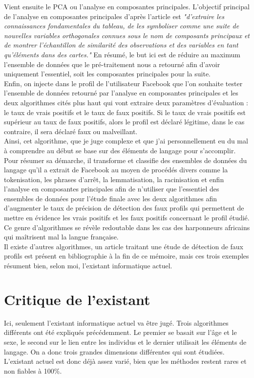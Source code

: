 \documentclass[12pt]{report}
\begin{document}
Vient ensuite le PCA ou l'analyse en composantes principales. L'objectif principal de l'analyse en composantes principales d'après l'article est \textit {"d'extraire les connaissances fondamentales du tableau, de les symboliser comme une suite de nouvelles variables orthogonales connues sous le nom de composants principaux et de montrer l'échantillon de similarité des observations et des variables en tant qu'éléments dans des cartes."} En résumé, le but ici est de réduire au maximum l'ensemble de données que le pré-traitement nous a retourné afin d'avoir uniquement l'essentiel, soit les composantes principales pour la suite.\\

Enfin, on injecte dans le profil de l'utilisateur Facebook que l'on souhaite tester l'ensemble de données retourné par l'analyse en composantes principales et les deux algorithmes cités plus haut qui vont extraire deux paramètres d'évaluation : le taux de vrais positifs et le taux de faux positifs. Si le taux de vrais positifs est supérieur au taux de faux positifs, alors le profil est déclaré légitime, dans le cas contraire, il sera déclaré faux ou malveillant.\\

Ainsi, cet algorithme, que je juge complexe et que j'ai personnellement eu du mal à comprendre au début se base sur des éléments de langage pour s'accomplir. Pour résumer sa démarche, il transforme et classifie des ensembles de données du langage qu'il a extrait de Facebook au moyen de procédés divers comme la tokenisation, les phrases d'arrêt, la lemmatisation, la racinisation et enfin l'analyse en composantes principales afin de n'utiliser que l'essentiel des ensembles de données pour l'étude finale avec les deux algorithmes afin d'augmenter le taux de précision de détection des faux profils qui permettent de mettre en évidence les vrais positifs et les faux positifs concernant le profil étudié. Ce genre d'algorithmes se révèle redoutable dans les cas des harponneurs africains qui maîtrisent mal la langue française.\\

Il existe d'autres algorithmes, un article traitant une étude de détection de faux profils est présent en bibliographie à la fin de ce mémoire, mais ces trois exemples résument bien, selon moi, l'existant informatique actuel.

\section{Critique de l'existant}
Ici, seulement l'existant informatique actuel va être jugé. Trois algorithmes différents ont été expliqués précédemment. Le premier se basait sur l'âge et le sexe, le second sur le lien entre les individus et le dernier utilisait les éléments de langage. On a donc trois grandes dimensions différentes qui sont étudiées. L'existant actuel est donc déjà assez varié, bien que les méthodes restent rares et non fiables à 100\%. \\
\end{document}
